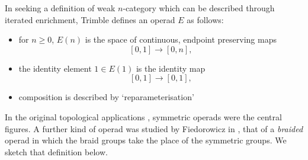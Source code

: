 \begin{example}\label{ex:non-sym}
In seeking a definition of weak $n$-category which can be described through iterated enrichment, Trimble defines an operad $E$ as follows:
    \begin{itemize}
        \item for $n \geq 0$, $E(n)$ is the space of continuous, endpoint preserving maps
            \[
                [0,1] \rightarrow [0,n],
            \]
        \item the identity element $1 \in E(1)$ is the identity map
            \[
                [0,1] \rightarrow [0,1],
            \]
        \item composition is described by `reparameterisation'
    \end{itemize}
\end{example}

In the original topological applications \cite{maygeom}, symmetric operads were the central figures. A further kind of operad was studied by Fiedorowicz in \cite{fie-br}, that of a \emph{braided} operad in which the braid groups take the place of the symmetric groups. We sketch that definition below.

